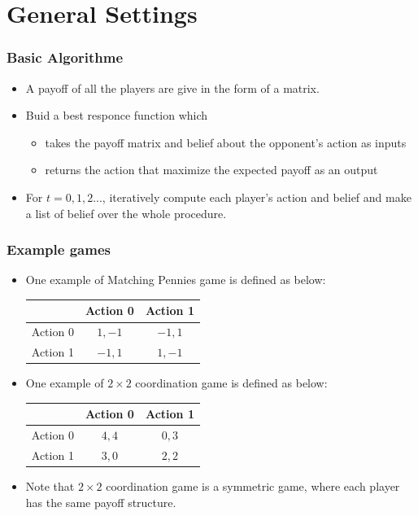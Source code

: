 \documentclass[dvipdfmx,fleqn]{beamer}
\begin{document}
\section{General Settings}

\begin{frame}
\frametitle{Basic Algorithme}
\begin{itemize}\setlength{\parskip}{0.5em}
\item
A payoff of all the players are give in the form of a matrix.

\item
Buid a best responce function which
 \begin{itemize}\setlength{\parskip}{0.5em}
 \item
 takes the payoff matrix and belief about the opponent's action as inputs

 \item
 returns the action that maximize the expected payoff as an output
 \end{itemize}
\item
For $t = 0, 1, 2...$, iteratively compute each player's action and belief and make a list of belief over the whole procedure.

\end{itemize}
\end{frame}

\begin{frame}
\frametitle{Example games}
\begin{itemize}\setlength{\parskip}{0.5em}
\item
One example of Matching Pennies game is defined as below:

 \begin{table}
 \begin{tabular}{|c|c|c|} \hline
    　 & Action 0 & Action 1 \\ \hline 
    Action 0 & $1,-1$ & $-1,1$ \\ \hline
    Action 1 & $-1,1$ & $1,-1$ \\ \hline
   \end{tabular}
  \end{table}

\item
One example of $2\times2$ coordination game is defined as below:

 \begin{table}
 \begin{tabular}{|c|c|c|} \hline
    　 & Action 0 & Action 1 \\ \hline 
    Action 0 & $4, 4$ & $0, 3$ \\ \hline
    Action 1 & $3, 0$ & $2, 2$ \\ \hline
   \end{tabular}
  \end{table}

\item
Note that $2\times2$ coordination game is a symmetric game, where each player has the same payoff structure.

\end{itemize}
\end{frame}
\end{document}
